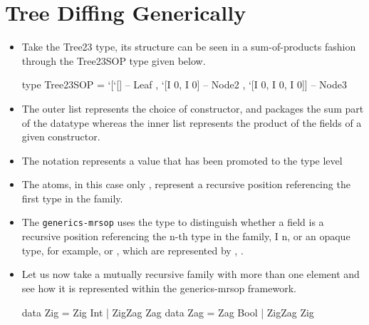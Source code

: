 \section{Tree Diffing Generically}
\begin{itemize}
    \item Take the Tree23 type, its structure can be seen in a sum-of-products fashion through the Tree23SOP type given below.
    \begin{haskell}
        type Tree23SOP = `[`[]                -- Leaf
                          , `[I 0, I 0]       -- Node2
                          , `[I 0, I 0, I 0]] -- Node3
    \end{haskell}
    \item The outer list represents the choice of constructor, and packages the sum part of the datatype whereas the inner list represents the product of the fields of a given constructor.
    \item The  notation represents a value that has been promoted to the type level
    \item The atoms, in this case only , represent a recursive position referencing the first type in the family.
    \item The \texttt{generics-mrsop} uses the type  to distinguish whether a field is a recursive position referencing the n-th type in the family, I n, or an opaque type, for example,  or , which are represented by , .
    \item Let us now take a mutually recursive family with more than one element and see how it is represented within the generics-mrsop framework.
    \begin{haskell}
        data Zig = Zig Int  | ZigZag Zag
        data Zag = Zag Bool | ZigZag Zig


\end{haskell}
\end{itemize}
